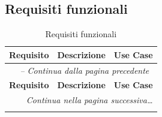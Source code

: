 \subsection{Requisiti funzionali}
\begin{longtable}{p{1.8cm} p{8.4cm} p{2.2cm}}
\caption{Requisiti funzionali} \label{tab:requisiti_funzionali} \\
\toprule
\textbf{Requisito} & \textbf{Descrizione} & \textbf{Use Case} \\
\midrule
\endfirsthead

\multicolumn{3}{c}{\textit{\tablename\ \thetable{} -- Continua dalla pagina precedente}} \\
\midrule
\textbf{Requisito} & \textbf{Descrizione} & \textbf{Use Case} \\
\midrule
\endhead

\midrule
\multicolumn{3}{r}{\textit{Continua nella pagina successiva\dots}} \\
\endfoot

\bottomrule
\endlastfoot


\end{longtable}
